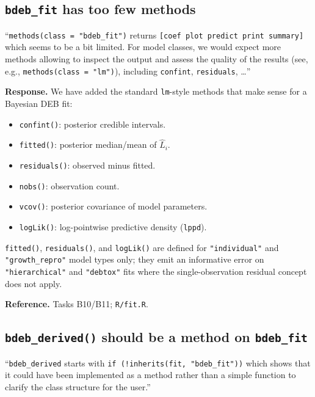 \documentclass[11pt,a4paper]{article}
\newcommand{\code}[1]{\texttt{#1}}
\begin{document}
\subsection{\code{bdeb\_fit} has too few methods}

\begin{displayquote}
``\verb|methods(class = "bdeb_fit")| returns
\verb|[coef plot predict print summary]| which seems to be a bit
limited. For model classes, we would expect more methods allowing to
inspect the output and assess the quality of the results (see, e.g.,
\verb|methods(class = "lm")|), including \code{confint},
\code{residuals}, \ldots''
\end{displayquote}

\textbf{Response.} We have added the standard \code{lm}-style methods
that make sense for a Bayesian DEB fit:

\begin{itemize}[nosep]
\item \code{confint()}: posterior credible intervals.
\item \code{fitted()}: posterior median/mean of $\hat{L}_i$.
\item \code{residuals()}: observed minus fitted.
\item \code{nobs()}: observation count.
\item \code{vcov()}: posterior covariance of model parameters.
\item \code{logLik()}: log-pointwise predictive density
  (\code{lppd}).
\end{itemize}

\code{fitted()}, \code{residuals()}, and \code{logLik()} are defined
for \verb|"individual"| and \verb|"growth_repro"| model types only;
they emit an informative error on \verb|"hierarchical"| and
\verb|"debtox"| fits where the single-observation residual concept
does not apply.

\textbf{Reference.} Tasks B10/B11; \code{R/fit.R}.

\subsection{\code{bdeb\_derived()} should be a method on
\code{bdeb\_fit}}

\begin{displayquote}
``\code{bdeb\_derived} starts with
\verb|if (!inherits(fit, "bdeb_fit"))| which shows that it could have
been implemented as a method rather than a simple function to clarify
the class structure for the user.''
\end{displayquote}
\end{document}
